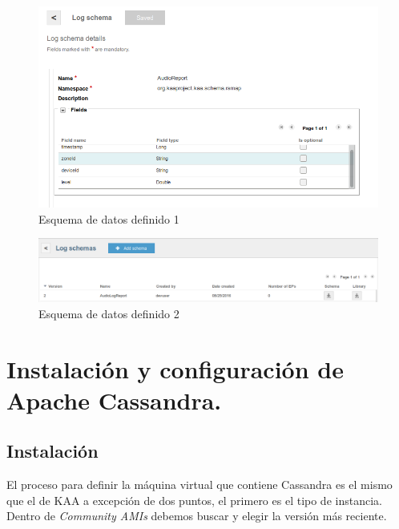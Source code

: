 \begin{figure}[!ht]
  \begin{center}
    \includegraphics[scale=0.45]{../images/kaa/13.png}
		\caption{Esquema de datos definido 1}
    \label{fig:kaa}
	\end{center}
\end{figure}

\begin{figure}[!ht]
  \begin{center}
    \includegraphics[scale=0.30]{../images/kaa/14.png}
		\caption{Esquema de datos definido 2}
    \label{fig:kaa}
	\end{center}
\end{figure}

\newpage

\newpage
\newpage
\newpage

\section{Instalación y configuración de Apache Cassandra.}

\subsection{Instalación}

El proceso para definir la máquina virtual que contiene Cassandra es el mismo que el de KAA a excepción de dos puntos, el primero es el tipo de instancia. Dentro de \textit{Community AMIs} debemos buscar  y elegir la versión más reciente.


